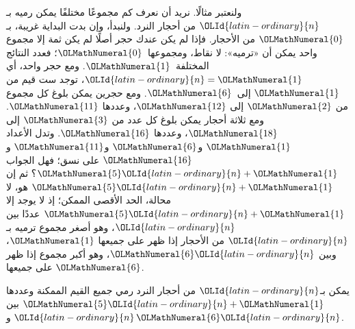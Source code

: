\documentclass[../../../include/open-logic-section]{subfiles}
\begin{document}
ولنعتبر مثالًا. نريد أن نعرف كم مجموعًا مختلفًا يمكن رميه بـ$\OLId{latin-ordinary}{n}$ من
أحجار النرد. ولنبدأ، وإن بدت البداية غريبة، بـ$\OLMathNumeral{0}$ من الأحجار. فإذا لم
يكن عندك حجر أصلًا لم يكن ثمة إلا مجموع واحد يمكن أن «ترميه»: لا نقاط،
ومجموعها~$\OLMathNumeral{0}$؛ فعدد النتائج المختلفة~$\OLMathNumeral{1}$. ومع حجر واحد، أي $\OLId{latin-ordinary}{n}=\OLMathNumeral{1}$،
توجد ست قيم من $\OLMathNumeral{1}$ إلى~$\OLMathNumeral{6}$. ومع حجرين يمكن بلوغ كل مجموع من $\OLMathNumeral{2}$ إلى
$\OLMathNumeral{12}$، وعددها $\OLMathNumeral{11}$. ومع ثلاثة أحجار يمكن بلوغ كل عدد من $\OLMathNumeral{3}$ إلى
$\OLMathNumeral{18}$، وعددها $\OLMathNumeral{16}$. وتدل الأعداد $\OLMathNumeral{1}$ و$\OLMathNumeral{6}$ و$\OLMathNumeral{11}$ و$\OLMathNumeral{16}$ على نسق؛ فهل
الجواب $\OLMathNumeral{5}\OLId{latin-ordinary}{n}+\OLMathNumeral{1}$؟ ثم إن $\OLMathNumeral{5}\OLId{latin-ordinary}{n}+\OLMathNumeral{1}$ هو، لا محالة، الحد الأقصى الممكن؛ إذ لا
يوجد إلا $\OLMathNumeral{5}\OLId{latin-ordinary}{n}+\OLMathNumeral{1}$ عددًا بين $\OLId{latin-ordinary}{n}$، وهو أصغر مجموع ترميه بـ$\OLId{latin-ordinary}{n}$ من الأحجار
إذا ظهر على جميعها $\OLMathNumeral{1}$، وبين $\OLMathNumeral{6}\OLId{latin-ordinary}{n}$، وهو أكبر مجموع إذا ظهر على جميعها
$\OLMathNumeral{6}$.

\begin{thm}
  يمكن بـ$\OLId{latin-ordinary}{n}$ من أحجار النرد رمي جميع القيم الممكنة وعددها $\OLMathNumeral{5}\OLId{latin-ordinary}{n}+\OLMathNumeral{1}$ بين
  $\OLId{latin-ordinary}{n}$ و$\OLMathNumeral{6}\OLId{latin-ordinary}{n}$.
\end{thm}
\end{document}
